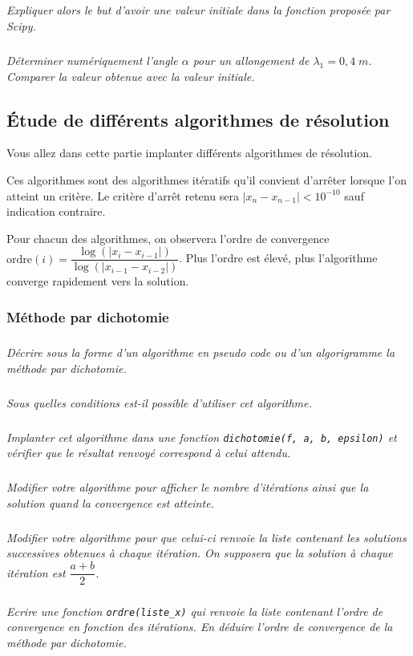 \documentclass[10pt]{article}
\begin{document}
\subparagraph{}
\textit{Expliquer alors le but d'avoir une valeur initiale dans la fonction proposée par Scipy.}

\subparagraph{}
\textit{Déterminer numériquement l'angle $\alpha$ pour un allongement de $\lambda_1={0,4}\; m$. Comparer la valeur obtenue avec la valeur initiale.}


\subsection{\'Etude de différents algorithmes de résolution}
Vous allez dans cette partie implanter différents algorithmes de résolution.

Ces algorithmes sont des algorithmes itératifs qu'il convient d'arrêter lorsque l'on atteint un critère.
Le critère d'arrêt retenu sera $|x_{n}-x_{n-1}| < 10^{-10}$ sauf indication contraire.

Pour chacun des algorithmes, on observera l'ordre de convergence $\textrm{ordre}(i) = \dfrac{\log(|x_{i}-x_{i-1}|)}{\log(|x_{i-1}-x_{i-2}|)}$. Plus l'ordre est élevé, plus l'algorithme converge rapidement vers la solution.

\subsubsection{Méthode par dichotomie}

\subparagraph{}
\textit{Décrire sous la forme d'un algorithme en pseudo code ou d'un algorigramme la méthode par dichotomie.}

\subparagraph{}
\textit{Sous quelles conditions est-il possible d'utiliser cet algorithme.}

\subparagraph{}\textit{Implanter cet algorithme dans une fonction \texttt{dichotomie(f, a, b, epsilon)} et vérifier que le résultat renvoyé correspond à celui attendu.}


\subparagraph{}\textit{Modifier votre algorithme pour afficher le nombre d'itérations ainsi que la solution quand la convergence est atteinte.}

\subparagraph{}\textit{Modifier votre algorithme pour que celui-ci renvoie la liste contenant les solutions successives obtenues à chaque itération. On supposera que la solution à chaque itération est $\dfrac{a+b}{2}$.}

\subparagraph{}\textit{Ecrire une fonction \texttt{ordre(liste\_x)} qui renvoie la liste contenant l'ordre de convergence en fonction des itérations. En déduire l'ordre de convergence de la méthode par dichotomie.}
\end{document}
